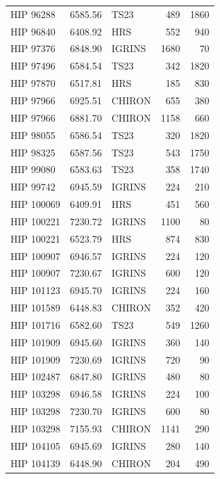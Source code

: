 {\begin{scriptsize}
\begin{longtable}{|l|rlrr|}
   HIP 96288 &  6585.56 &       TS23 &      489 &  1860 \\
   HIP 96840 &  6408.92 &        HRS &      552 &   940 \\
   HIP 97376 &  6848.90 &     IGRINS &     1680 &    70 \\
   HIP 97496 &  6584.54 &       TS23 &      342 &  1820 \\
   HIP 97870 &  6517.81 &        HRS &      185 &   830 \\
   HIP 97966 &  6925.51 &     CHIRON &      655 &   380 \\
   HIP 97966 &  6881.70 &     CHIRON &     1158 &   660 \\
   HIP 98055 &  6586.54 &       TS23 &      320 &  1820 \\
   HIP 98325 &  6587.56 &       TS23 &      543 &  1750 \\
   HIP 99080 &  6583.63 &       TS23 &      358 &  1740 \\
   HIP 99742 &  6945.59 &     IGRINS &      224 &   210 \\
  HIP 100069 &  6409.91 &        HRS &      451 &   560 \\
  HIP 100221 &  7230.72 &     IGRINS &     1100 &    80 \\
  HIP 100221 &  6523.79 &        HRS &      874 &   830 \\
  HIP 100907 &  6946.57 &     IGRINS &      224 &   120 \\
  HIP 100907 &  7230.67 &     IGRINS &      600 &   120 \\
  HIP 101123 &  6945.70 &     IGRINS &      224 &   160 \\
  HIP 101589 &  6448.83 &     CHIRON &      352 &   420 \\
  HIP 101716 &  6582.60 &       TS23 &      549 &  1260 \\
  HIP 101909 &  6945.60 &     IGRINS &      360 &   140 \\
  HIP 101909 &  7230.69 &     IGRINS &      720 &    90 \\
  HIP 102487 &  6847.80 &     IGRINS &      480 &    80 \\
  HIP 103298 &  6946.58 &     IGRINS &      224 &   100 \\
  HIP 103298 &  7230.70 &     IGRINS &      600 &    80 \\
  HIP 103298 &  7155.93 &     CHIRON &     1141 &   290 \\
  HIP 104105 &  6945.69 &     IGRINS &      280 &   140 \\
  HIP 104139 &  6448.90 &     CHIRON &      204 &   490 \\

\end{longtable}
\end{scriptsize}}
